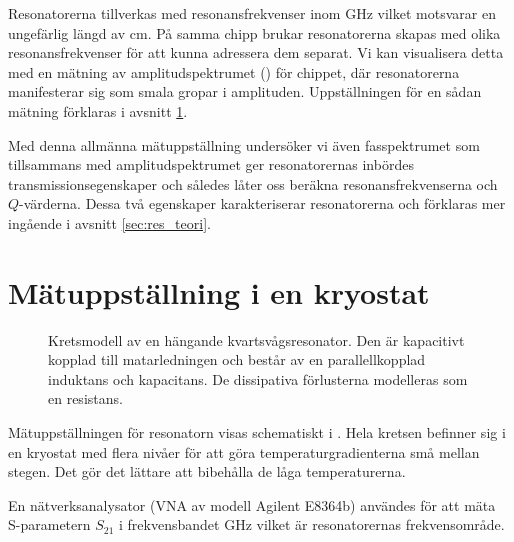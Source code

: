 \documentclass[main.tex]{subfiles}
\begin{document}
Resonatorerna tillverkas med resonansfrekvenser inom \unit[4-8]{GHz} vilket motsvarar en ungefärlig längd av \unit[1-2]{cm}. På samma chipp brukar resonatorerna skapas med olika resonansfrekvenser för att kunna adressera dem separat. Vi kan visualisera detta med en mätning av amplitudspektrumet () för chippet, där resonatorerna manifesterar sig som smala gropar i amplituden. Uppställningen för en sådan mätning förklaras i avsnitt \ref{sec:matuppstallning}.


Med denna allmänna mätuppställning undersöker vi även fasspektrumet som tillsammans med amplitudspektrumet ger resonatorernas inbördes transmissionsegenskaper och således låter oss beräkna resonansfrekvenserna och $Q$-värderna. Dessa två egenskaper karakteriserar resonatorerna och förklaras mer ingående i avsnitt \ref{sec:res_teori}.

\newpage
\section{Mätuppställning i en kryostat}
\label{sec:matuppstallning}


\begin{figure}
    \centering
    \begin{circuitikz}[line width=1pt,scale=0.65]
        
    \end{circuitikz}
    \caption{Kretsmodell av en hängande kvartsvågsresonator. Den är kapacitivt kopplad till matarledningen och består av en parallellkopplad induktans och kapacitans. De dissipativa förlusterna modelleras som en resistans.}
    \label{fig:ekviv_krets}
\end{figure}


Mätuppställningen för resonatorn visas schematiskt i . Hela kretsen befinner sig i en kryostat med flera nivåer för att göra temperaturgradienterna små mellan stegen. Det gör det lättare att bibehålla de låga temperaturerna.

En nätverksanalysator (VNA av modell Agilent E8364b) användes för att mäta S-parametern $S_{21}$ i frekvensbandet \unit[4-8]{GHz} vilket är resonatorernas frekvensområde.
\end{document}
